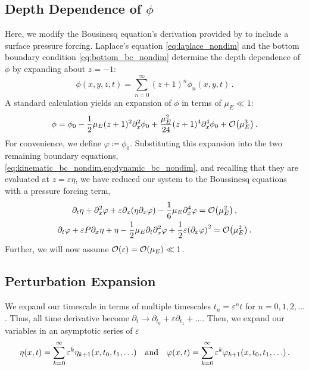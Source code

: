 \documentclass{jfm}
\renewcommand*{\epsilon}{\varepsilon}
\begin{document}
\subsection{Depth Dependence of \texorpdfstring{$\phi$}{Velocity Potential}}
Here, we modify the Bousinesq equation's derivation provided by
\citet{mei2005nonlinear} to include a surface pressure forcing.
Laplace's equation \cref{eq:laplace_nondim} and the bottom boundary
condition \cref{eq:bottom_bc_nondim} determine the depth dependence of
$\phi$ by expanding about $z=-1$:
\begin{equation}
  \phi(x,y,z,t) = \sum_{n=0}^\infty (z+1)^n\phi_n(x,y,t) \,.
\end{equation}
A standard calculation \citep[\eg][]{mei2005nonlinear} yields an
expansion of $\phi$ in terms of $\mu_E \ll 1$:
\begin{equation}
  \phi = \phi_0 - \frac{1}{2}\mu_E (z+1)^2\partial^2_x\phi_0 +
  \frac{\mu_E^2}{24}(z+1)^4\partial^4_x\phi_0 +
  \order{\mu_E^3} \,.
\end{equation}
For convenience, we define $\varphi \coloneqq \phi_0$.
Substituting this expansion into the two remaining boundary equations,
\cref{eq:kinematic_bc_nondim,eq:dynamic_bc_nondim}, and recalling that
they are evaluated at $z=\epsilon \eta$, we have reduced our system to
the Boussinesq equations with a pressure forcing term,
\begin{gather}
  \partial_t \eta + \partial_x^2 \varphi + \epsilon \partial_x
    \pqty{\eta \partial_x \varphi} -\frac{1}{6}\mu_E \partial^4_x
    \varphi = \order{\mu_E^2} \label{eq:kinematic_bc_varphi} \,, \\
  \partial_t \varphi + \epsilon P \partial_x \eta + \eta -
    \frac{1}{2}\mu_E \partial_t \partial_x^2 \varphi +
    \frac{1}{2}\epsilon\pqty{\partial_x \varphi}^2 = \order{\mu_E^2} \,.
    \label{eq:dynamic_bc_varphi}
\end{gather}
Further, we will now assume $\order{\epsilon} = \order{\mu_E} \ll 1$.

\subsection{\label{sec:shallow_water} Perturbation Expansion}
We expand our timescale in terms of multiple timescales $t_n =
\epsilon^n t$ for $n= 0,1,2,\ldots$.
Thus, all time derivative become $\partial_t \to \partial_{t_0} +
\epsilon \partial_{t_1} + \ldots$.
Then, we expand our variables in an asymptotic series of $\epsilon$
\begin{equation}
  \eta(x,t) = \sum_{k=0}^{\infty} \epsilon^k
    \eta_{k+1}(x,t_0,t_1,\ldots) \qq{and}
  \varphi(x,t) = \sum_{k=0}^{\infty} \epsilon^k
    \varphi_{k+1}(x,t_0,t_1,\ldots) \,.
\end{equation}
\end{document}
